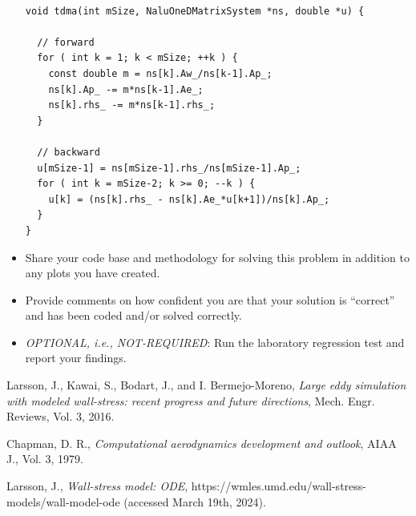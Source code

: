 \documentclass{article}
\begin{document}
\begin{itemize}
\begin{lstlisting}[caption={This is a tri-diagonal implicit matrix solve routine (also
known as the Thomas Algorithm) and is suitable for solving a diagonal dominant matrix system. For structured
three-dimensional applications, alternating sweep directions can be combined with the tri-diagonal solve. In this 
implementation, the matrix coefficients are modified and are not intended to be re-used for each subsequent 
iteration.},captionpos=b]

void tdma(int mSize, NaluOneDMatrixSystem *ns, double *u) {
  
  // forward
  for ( int k = 1; k < mSize; ++k ) {
    const double m = ns[k].Aw_/ns[k-1].Ap_;
    ns[k].Ap_ -= m*ns[k-1].Ae_;
    ns[k].rhs_ -= m*ns[k-1].rhs_;
  }

  // backward
  u[mSize-1] = ns[mSize-1].rhs_/ns[mSize-1].Ap_;
  for ( int k = mSize-2; k >= 0; --k ) {
    u[k] = (ns[k].rhs_ - ns[k].Ae_*u[k+1])/ns[k].Ap_;
  }
}

\end{lstlisting}

\item Share your code base and methodology for solving this problem in addition to any plots you have created.

\item Provide comments on how confident you are that your solution is ``correct'' and has been coded and/or 
solved correctly.

\item \emph{OPTIONAL, i.e., NOT-REQUIRED}: Run the laboratory regression test and report your findings.

\end{itemize}


\begin{thebibliography}{100}

 Larsson, J., Kawai, S., Bodart, J., and I. Bermejo-Moreno, \emph{Large eddy simulation with modeled wall-stress: recent progress and future directions}, Mech. Engr. Reviews, Vol. 3, 2016.

 Chapman, D. R., \emph{Computational aerodynamics development and outlook}, AIAA J., Vol. 3, 1979.

 Larsson, J., \emph{Wall-stress model: ODE}, https://wmles.umd.edu/wall-stress-models/wall-model-ode (accessed March 19th, 2024).

\end{thebibliography}
\end{document}
